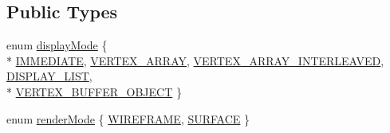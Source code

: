\subsection*{Public Types}
\begin{DoxyCompactItemize}
\item 
enum \hyperlink{class_geom_base_a3259d41feab8f1c2b3e93e44ea06c8eb}{display\-Mode} \{ \\*
\hyperlink{class_geom_base_a3259d41feab8f1c2b3e93e44ea06c8eba26366b3d7c1226aaea4c80fa725116e3}{I\-M\-M\-E\-D\-I\-A\-T\-E}, 
\hyperlink{class_geom_base_a3259d41feab8f1c2b3e93e44ea06c8eba68fe3d2e6fab911d713140e124294e9b}{V\-E\-R\-T\-E\-X\-\_\-\-A\-R\-R\-A\-Y}, 
\hyperlink{class_geom_base_a3259d41feab8f1c2b3e93e44ea06c8ebadf4d9f5dab8ef3b7e4870d81a40c733e}{V\-E\-R\-T\-E\-X\-\_\-\-A\-R\-R\-A\-Y\-\_\-\-I\-N\-T\-E\-R\-L\-E\-A\-V\-E\-D}, 
\hyperlink{class_geom_base_a3259d41feab8f1c2b3e93e44ea06c8ebae91981c414821bfab61a65228dc8fc57}{D\-I\-S\-P\-L\-A\-Y\-\_\-\-L\-I\-S\-T}, 
\\*
\hyperlink{class_geom_base_a3259d41feab8f1c2b3e93e44ea06c8eba7431471ddf565855d64c64cb569e10cf}{V\-E\-R\-T\-E\-X\-\_\-\-B\-U\-F\-F\-E\-R\-\_\-\-O\-B\-J\-E\-C\-T}
 \}
\item 
enum \hyperlink{class_geom_base_a5ac81c5c0144bf51c40efc219f1973e2}{render\-Mode} \{ \hyperlink{class_geom_base_a5ac81c5c0144bf51c40efc219f1973e2a8f44b953b7e493103c192eb7c434481f}{W\-I\-R\-E\-F\-R\-A\-M\-E}, 
\hyperlink{class_geom_base_a5ac81c5c0144bf51c40efc219f1973e2a5795acdbf2229751e91ab3bf59fec100}{S\-U\-R\-F\-A\-C\-E}
 \}
\end{DoxyCompactItemize}
